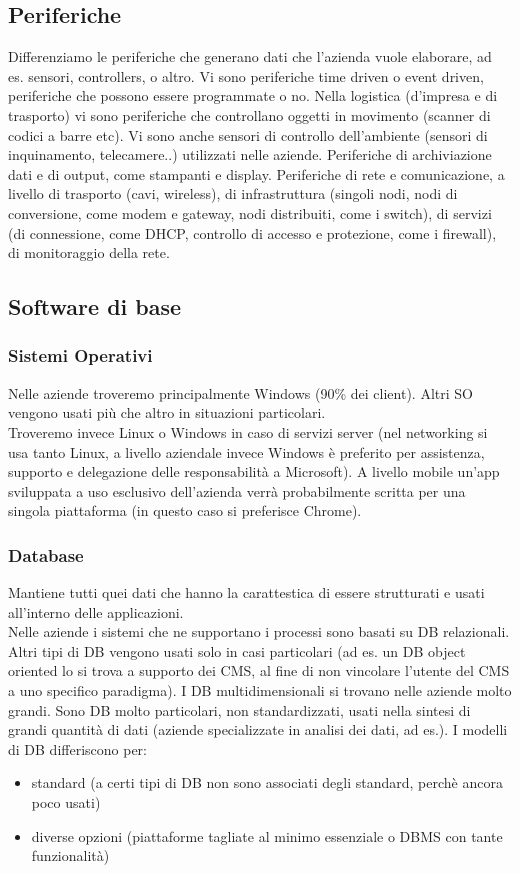 \subsection{Periferiche}
Differenziamo le periferiche che generano dati che l'azienda vuole elaborare, ad es. sensori, controllers, o altro.
Vi sono periferiche time driven o event driven, periferiche che possono essere programmate o no.
Nella logistica (d'impresa e di trasporto) vi sono periferiche che controllano oggetti in movimento (scanner di codici a barre etc).
Vi sono anche sensori di controllo dell'ambiente (sensori di inquinamento, telecamere..) utilizzati nelle aziende.
Periferiche di archiviazione dati e di output, come stampanti e display.
Periferiche di rete e comunicazione, a livello di trasporto (cavi, wireless), di infrastruttura (singoli nodi, nodi di conversione, come modem e gateway, nodi distribuiti, come i switch), di servizi (di connessione, come DHCP, controllo di accesso e protezione, come i firewall), di monitoraggio della rete.

\subsection{Software di base}
\subsubsection{Sistemi Operativi}
Nelle aziende troveremo principalmente Windows (90\% dei client). Altri SO vengono usati
pi\`u che altro in situazioni particolari. \\
Troveremo invece Linux o Windows in caso di servizi server (nel networking si usa tanto Linux, a livello
aziendale invece Windows \`e preferito per assistenza, supporto e delegazione delle responsabilit\`a a Microsoft).
A livello mobile un'app sviluppata a uso esclusivo dell'azienda verr\`a probabilmente scritta
per una singola piattaforma (in questo caso si preferisce Chrome).
\subsubsection{Database}
\label{subs:Database}
Mantiene tutti quei dati che hanno la carattestica di essere strutturati e usati all'interno
delle applicazioni.\\
Nelle aziende i sistemi che ne supportano i processi sono basati su DB relazionali.
Altri tipi di DB vengono usati solo in casi particolari (ad es. un DB object oriented
lo si trova a supporto dei CMS, al fine di non vincolare l'utente del CMS a uno specifico paradigma).
I DB multidimensionali si trovano nelle aziende molto grandi. Sono DB molto particolari, non standardizzati,
usati nella sintesi di grandi quantit\`a di dati (aziende specializzate in analisi dei dati, ad es.).
I modelli di DB differiscono per:
\begin{itemize}
  \item standard (a certi tipi di  DB non sono associati degli standard, perch\`e ancora poco usati)
  \item diverse opzioni (piattaforme tagliate al minimo essenziale o DBMS con tante funzionalit\`a)
\end{itemize}

